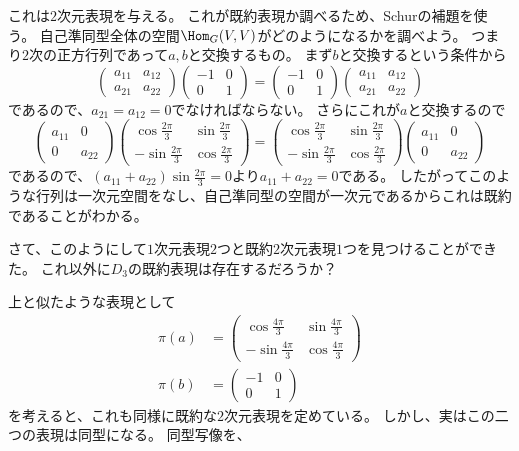 \documentclass{jsarticle}
\begin{document}
これは$2$次元表現を与える。
これが既約表現か調べるため、Schurの補題を使う。
自己準同型全体の空間$\Hom_G(V,V)$がどのようになるかを調べよう。
つまり$2$次の正方行列であって$a, b$と交換するもの。
まず$b$と交換するという条件から
\[
\begin{pmatrix}a_{11}&a_{12}\\ a_{21}&a_{22}\end{pmatrix}\begin{pmatrix}-1&0\\0&1\end{pmatrix}=
\begin{pmatrix}-1&0\\0&1\end{pmatrix}\begin{pmatrix}a_{11}&a_{12}\\ a_{21}&a_{22}\end{pmatrix}
\]
であるので、$a_{21}=a_{12}=0$でなければならない。
さらにこれが$a$と交換するので
\[
\begin{pmatrix}a_{11}&0\\ 0&a_{22}\end{pmatrix}\begin{pmatrix}\cos \frac{2\pi}{3}&\sin \frac{2\pi}{3}\\-\sin \frac{2\pi}{3}&\cos \frac{2\pi}{3}\end{pmatrix}=
\begin{pmatrix}\cos \frac{2\pi}{3}&\sin \frac{2\pi}{3}\\-\sin \frac{2\pi}{3}&\cos \frac{2\pi}{3}\end{pmatrix}\begin{pmatrix}a_{11}&0\\0&a_{22}\end{pmatrix}
\]
であるので、$(a_{11}+a_{22})\sin\frac{2\pi}{3}=0$より$a_{11}+a_{22}=0$である。
したがってこのような行列は一次元空間をなし、自己準同型の空間が一次元であるからこれは既約であることがわかる。

さて、このようにして$1$次元表現$2$つと既約$2$次元表現$1$つを見つけることができた。
これ以外に$D_3$の既約表現は存在するだろうか？

上と似たような表現として
\begin{align*}
\pi(a)&=\begin{pmatrix}\cos \frac{4\pi}{3}&\sin \frac{4\pi}{3}\\-\sin \frac{4\pi}{3}&\cos \frac{4\pi}{3}\end{pmatrix}\\
\pi(b)&=\begin{pmatrix}-1&0\\0&1\end{pmatrix}
\end{align*}
を考えると、これも同様に既約な$2$次元表現を定めている。
しかし、実はこの二つの表現は同型になる。
同型写像を、
\end{document}
